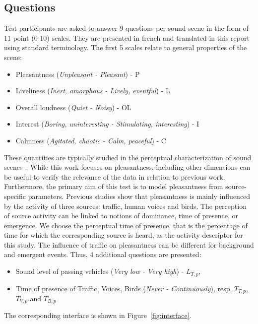 \documentclass[11pt,a4paper]{article}
\begin{document}
\subsection{Questions}

Test participants are asked to answer 9 questions per sound scene in the form of 11 point (0-10) scales. They are presented in french and translated in this report using standard terminology. The first 5 scales relate to general properties of the scene:
\begin{itemize}
\item Pleasantness (\textit{Unpleasant - Pleasant}) - P
\item Liveliness (\textit{Inert, amorphous - Lively, eventful}) - L
\item Overall loudness (\textit{Quiet - Noisy}) - OL
\item Interest (\textit{Boring, uninteresting - Stimulating, interesting}) - I
\item Calmness (\textit{Agitated, chaotic - Calm, peaceful}) - C
\end{itemize}
These quantities are typically studied in the perceptual characterization of sound scenes~\cite{axelsson2010, aumond2017, nilsson2007}. While this work focuses on pleasantness, including other dimensions can be useful to verify the relevance of the data in relation to previous work.\\
Furthermore, the primary aim of this test is to model pleasantness from source-specific parameters. Previous studies show that pleasantness is mainly influenced by the activity of three sources: traffic, human voices and birds. The perception of source activity can be linked to notions of dominance, time of presence,  or emergence. We choose the perceptual time of presence, that is the percentage of time for which the corresponding source is heard, as the activity descriptor for this study. The influence of traffic on pleasantness can be different for background and emergent events. Thus, 4 additional questions are presented:
\begin{itemize}
\item Sound level of passing vehicles (\textit{Very low - Very high}) - $L_{T, p}$,
\item Time of presence of Traffic, Voices, Birds (\textit{Never - Continuously}), resp. $T_{T, p}$, $T_{V, p}$ and $T_{B, p}$
\end{itemize}
The corresponding interface is shown in Figure~\ref{fig:interface}.
\end{document}
